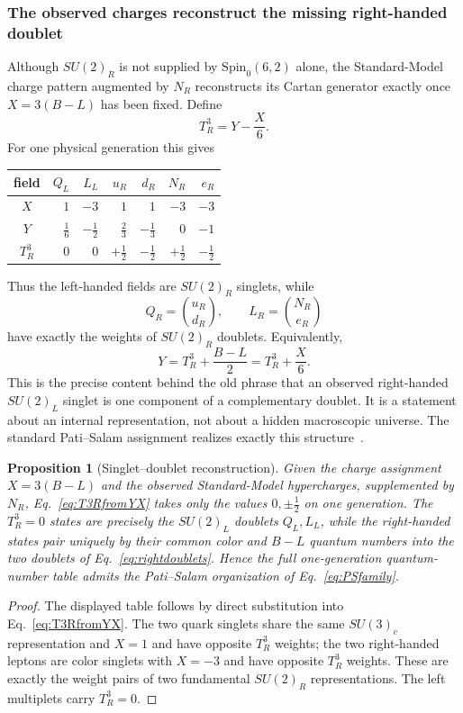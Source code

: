 \documentclass[11pt]{article}
\newtheorem{proposition}[theorem]{Proposition}
\theoremstyle{definition}\newtheorem{definition}[theorem]{Definition}
\theoremstyle{remark}\newtheorem{remark}[theorem]{Remark}\newtheorem{conjecture}[theorem]{Conjecture}
\begin{document}
\subsubsection{The observed charges reconstruct the missing right-handed doublet}
Although $SU(2)_R$ is not supplied by $\mathrm{Spin}_0(6,2)$ alone, the Standard-Model charge pattern augmented by $N_R$ reconstructs its Cartan generator exactly once $X=3(B-L)$ has been fixed. Define
\begin{equation}\label{eq:T3RfromYX}
 \boxed{T^3_R=Y-\frac{X}{6}.}
\end{equation}
For one physical generation this gives
\begin{center}
\begin{tabular}{c|rrrrrr}
field & $Q_L$ & $L_L$ & $u_R$ & $d_R$ & $N_R$ & $e_R$\\
\hline
$X$ & $1$ & $-3$ & $1$ & $1$ & $-3$ & $-3$\\
$Y$ & $\frac16$ & $-\frac12$ & $\frac23$ & $-\frac13$ & $0$ & $-1$\\
$T^3_R$ & $0$ & $0$ & $+\frac12$ & $-\frac12$ & $+\frac12$ & $-\frac12$
\end{tabular}
\end{center}
Thus the left-handed fields are $SU(2)_R$ singlets, while
\begin{equation}\label{eq:rightdoublets}
 \boxed{
 Q_R=\binom{u_R}{d_R},\qquad
 L_R=\binom{N_R}{e_R}}
\end{equation}
have exactly the weights of $SU(2)_R$ doublets. Equivalently,
\begin{equation}\label{eq:hyperchargePS}
 \boxed{Y=T^3_R+\frac{B-L}{2}=T^3_R+\frac{X}{6}.}
\end{equation}
This is the precise content behind the old phrase that an observed right-handed $SU(2)_L$ singlet is one component of a complementary doublet. It is a statement about an internal representation, not about a hidden macroscopic universe. The standard Pati--Salam assignment realizes exactly this structure~\cite{PatiSalam1974}.

\begin{proposition}[Singlet--doublet reconstruction]\label{prop:singletdoubletreconstruction}
Given the charge assignment $X=3(B-L)$ and the observed Standard-Model hypercharges, supplemented by $N_R$, Eq.~\eqref{eq:T3RfromYX} takes only the values $0,\pm\frac12$ on one generation. The $T^3_R=0$ states are precisely the $SU(2)_L$ doublets $Q_L,L_L$, while the right-handed states pair uniquely by their common color and $B-L$ quantum numbers into the two doublets of Eq.~\eqref{eq:rightdoublets}. Hence the full one-generation quantum-number table admits the Pati--Salam organization of Eq.~\eqref{eq:PSfamily}.
\end{proposition}
\begin{proof}
The displayed table follows by direct substitution into Eq.~\eqref{eq:T3RfromYX}. The two quark singlets share the same $SU(3)_c$ representation and $X=1$ and have opposite $T^3_R$ weights; the two right-handed leptons are color singlets with $X=-3$ and have opposite $T^3_R$ weights. These are exactly the weight pairs of two fundamental $SU(2)_R$ representations. The left multiplets carry $T^3_R=0$.
\end{proof}
\end{document}
